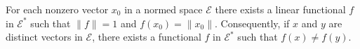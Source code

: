 For each nonzero vector $x_0$ in a normed space $\mathcal{E}$ there exists a linear functional $f$ in $\mathcal{E}^*$ such that $\|f\| = 1$ and $f(x_0) = \|x_0\|$. Consequently, if $x$ and $y$ are distinct vectors in $\mathcal{E}$, there exists a functional $f$ in $\mathcal{E}^*$ such that $f(x) \neq f(y)$.
